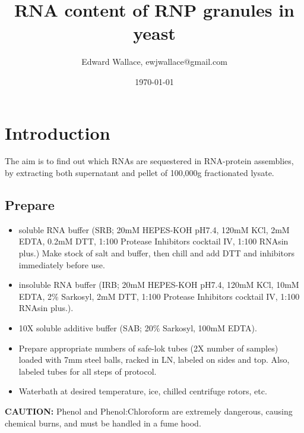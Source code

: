 \documentclass{article}
\begin{document}
\title{RNA content of RNP granules in yeast}
\author{Edward Wallace, ewjwallace@gmail.com}
\date{\today}
\maketitle


\section*{Introduction}

The aim is to find out which RNAs are sequestered in RNA-protein assemblies, by extracting both supernatant and pellet of 100,000g fractionated lysate. %

\subsection*{Prepare}

\begin{itemize}
  \item soluble RNA buffer (SRB; 20mM HEPES-KOH pH7.4, 120mM KCl, 2mM EDTA, 0.2mM DTT, 1:100 Protease Inhibitors cocktail IV, 1:100 RNAsin plus.) Make stock of salt and buffer, then chill and add DTT and inhibitors immediately before use.
  \item insoluble RNA buffer (IRB; 20mM HEPES-KOH pH7.4, 120mM KCl, 10mM EDTA, 2\% Sarkosyl, 2mM DTT, 1:100 Protease Inhibitors cocktail IV, 1:100 RNAsin plus.). 
  \item 10X soluble additive buffer (SAB; 20\% Sarkosyl, 100mM EDTA). %
  \item Prepare appropriate numbers of safe-lok tubes (2X number of samples) loaded with 7mm steel balls, racked in LN, labeled on sides and top. Also, labeled tubes for all steps of protocol.
  \item Waterbath at desired temperature, ice, chilled centrifuge rotors, etc.
\end{itemize}

\textbf{CAUTION:} Phenol and Phenol:Chloroform are extremely dangerous, causing chemical burns, and must be handled in a fume hood.
\end{document}
